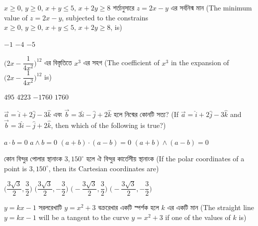 \documentclass[addpoints]{exam}
\begin{document}
\begin{questions}
\begin{oneparchoices}

\end{oneparchoices}

\question  $ x\ge 0,\,y\ge 0,\, x+y\le 5,\,x+2y\ge 8 $ শর্তানুসারে $ z=2x-y $ এর সর্বনিন্ম মান (The minimum value of $ z=2x-y $, subjected to the constrains $ x\ge 0,\,y\ge 0,\, x+y\le 5,\,x+2y\ge 8 $, is) 

\begin{oneparchoices}
\choice $ -1 $
\choice $ -4 $
\choice $ -5 $

\end{oneparchoices}

\question  $ \Bigg(2x-\dfrac{1}{4x^2}\Bigg)^{12} $ এর বিস্তৃতিতে $ x^3 $ এর সহগ (The coefficient of $x^3$ in the expansion of $ \Bigg(2x-\dfrac{1}{4x^2}\Bigg)^{12} $ is) 
\begin{oneparchoices}
\choice $ 495 $
\choice $ 4223 $
\choice $ -1760 $
\choice $ 1760 $

\end{oneparchoices}

\question  $ \vec{a}  = \hat{i}+2\hat{j}-3\hat{k} $ এবং $ \vec{b} = 3\hat{i}-\hat{j}+2\hat{k} $ হলে নিন্মের কোনটি সত্য? (If $ \vec{a}  = \hat{i}+2\hat{j}-3\hat{k} $ and $ \vec{b} = 3\hat{i}-\hat{j}+2\hat{k} $, then which of the following is true?)

\begin{oneparchoices}
\choice $ a\cdot b =0  $
\choice $ a\wedge b =0 $
\choice $ (a+b)\cdot (a-b) = 0 $
\choice $ (a+b)\wedge (a-b) = 0 $

\end{oneparchoices}

\question   কোন বিন্দুর পোলার স্থানাংক $ 3,150^{\circ} $ হলে ঐ বিন্দুর কার্তেসীয় স্থানাংক (If the polar coordinates of a point is $ 3,150^{\circ} $, then its Cartesian coordinates are) 

\begin{oneparchoices}
\choice $\Big(\dfrac{3\sqrt{3}}{2}, \dfrac{3}{2} \Big)$
\choice $\Big(\dfrac{3\sqrt{3}}{2}, -\dfrac{3}{2} \Big) $
\choice $\Big(-\dfrac{3\sqrt{3}}{2}, \dfrac{3}{2} \Big) $
\choice $\Big(-\dfrac{3\sqrt{3}}{2}, -\dfrac{3}{2} \Big) $

\end{oneparchoices}


\question $ y=kx-1 $ সরলরেখাটি $ y=x^{2}+3 $ বক্ররেখার একটি স্পর্শক হলে $ k $ এর একটি মান (The straight line $ y=kx-1 $ will be a tangent to the curve $ y=x^{2}+3 $ if one of the values of $k$ is)


\end{questions}
\end{document}
